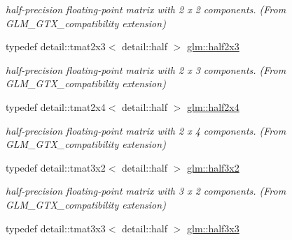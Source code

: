 \begin{DoxyCompactItemize}
\begin{DoxyCompactList}\small\item\em half-\/precision floating-\/point matrix with 2 x 2 components. (From G\+L\+M\+\_\+\+G\+T\+X\+\_\+compatibility extension) \end{DoxyCompactList}\item 
\hypertarget{group__gtx__compatibility_ga0e518064506fff03092df56d20fe2430}{}typedef detail\+::tmat2x3$<$ detail\+::half $>$ \hyperlink{group__gtx__compatibility_ga0e518064506fff03092df56d20fe2430}{glm\+::half2x3}\label{group__gtx__compatibility_ga0e518064506fff03092df56d20fe2430}

\begin{DoxyCompactList}\small\item\em half-\/precision floating-\/point matrix with 2 x 3 components. (From G\+L\+M\+\_\+\+G\+T\+X\+\_\+compatibility extension) \end{DoxyCompactList}\item 
\hypertarget{group__gtx__compatibility_gaaed7bbe12749cdc0d4baf92063e523ea}{}typedef detail\+::tmat2x4$<$ detail\+::half $>$ \hyperlink{group__gtx__compatibility_gaaed7bbe12749cdc0d4baf92063e523ea}{glm\+::half2x4}\label{group__gtx__compatibility_gaaed7bbe12749cdc0d4baf92063e523ea}

\begin{DoxyCompactList}\small\item\em half-\/precision floating-\/point matrix with 2 x 4 components. (From G\+L\+M\+\_\+\+G\+T\+X\+\_\+compatibility extension) \end{DoxyCompactList}\item 
\hypertarget{group__gtx__compatibility_gaf3575ca960978c71cea0a331491c7655}{}typedef detail\+::tmat3x2$<$ detail\+::half $>$ \hyperlink{group__gtx__compatibility_gaf3575ca960978c71cea0a331491c7655}{glm\+::half3x2}\label{group__gtx__compatibility_gaf3575ca960978c71cea0a331491c7655}

\begin{DoxyCompactList}\small\item\em half-\/precision floating-\/point matrix with 3 x 2 components. (From G\+L\+M\+\_\+\+G\+T\+X\+\_\+compatibility extension) \end{DoxyCompactList}\item 
\hypertarget{group__gtx__compatibility_ga77483a34e4d7367fda6615e9b000aa32}{}typedef detail\+::tmat3x3$<$ detail\+::half $>$ \hyperlink{group__gtx__compatibility_ga77483a34e4d7367fda6615e9b000aa32}{glm\+::half3x3}\label{group__gtx__compatibility_ga77483a34e4d7367fda6615e9b000aa32}


\end{DoxyCompactItemize}

